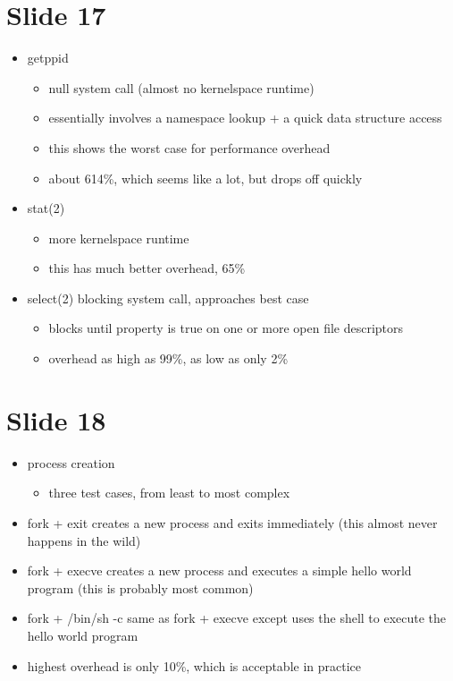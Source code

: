 \documentclass[
  12pt]{findlay}
\providecommand{\tightlist}{\setlength{\itemsep}{0pt}\setlength{\parskip}{0pt}}
\begin{document}
\hypertarget{slide-17}{%
\section{Slide 17}\label{slide-17}}

\begin{itemize}
\tightlist
\item
  getppid

  \begin{itemize}
  \tightlist
  \item
    null system call (almost no kernelspace runtime)
  \item
    essentially involves a namespace lookup + a quick data structure
    access
  \item
    this shows the worst case for performance overhead
  \item
    about 614\%, which seems like a lot, but drops off quickly
  \end{itemize}
\item
  stat(2)

  \begin{itemize}
  \tightlist
  \item
    more kernelspace runtime
  \item
    this has much better overhead, 65\%
  \end{itemize}
\item
  select(2) blocking system call, approaches best case

  \begin{itemize}
  \tightlist
  \item
    blocks until property is true on one or more open file descriptors
  \item
    overhead as high as 99\%, as low as only 2\%
  \end{itemize}
\end{itemize}

\hypertarget{slide-18}{%
\section{Slide 18}\label{slide-18}}

\begin{itemize}
\tightlist
\item
  process creation

  \begin{itemize}
  \tightlist
  \item
    three test cases, from least to most complex
  \end{itemize}
\item
  fork + exit creates a new process and exits immediately (this almost
  never happens in the wild)
\item
  fork + execve creates a new process and executes a simple hello world
  program (this is probably most common)
\item
  fork + /bin/sh -c same as fork + execve except uses the shell to
  execute the hello world program
\item
  highest overhead is only 10\%, which is acceptable in practice
\end{itemize}
\end{document}

